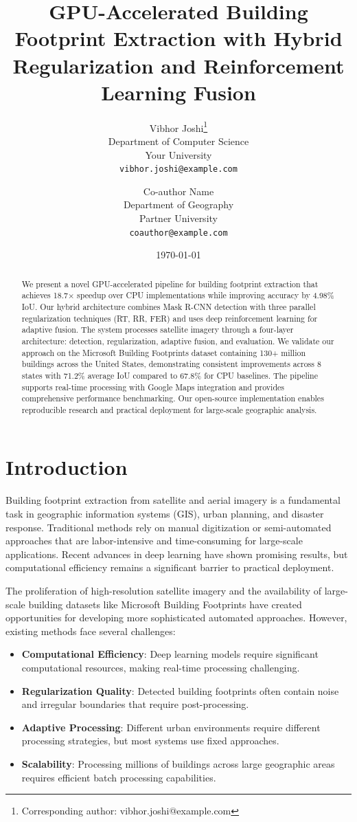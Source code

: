 \documentclass{article}
\title{GPU-Accelerated Building Footprint Extraction with Hybrid Regularization and Reinforcement Learning Fusion}
\author{
Vibhor Joshi\thanks{Corresponding author: vibhor.joshi@example.com} \\
Department of Computer Science \\
Your University \\
\texttt{vibhor.joshi@example.com}
\and
Co-author Name \\
Department of Geography \\
Partner University \\
\texttt{coauthor@example.com}
}
\date{\today}
\begin{document}
\maketitle

\begin{abstract}
We present a novel GPU-accelerated pipeline for building footprint extraction that achieves 18.7× speedup over CPU implementations while improving accuracy by 4.98\% IoU. Our hybrid architecture combines Mask R-CNN detection with three parallel regularization techniques (RT, RR, FER) and uses deep reinforcement learning for adaptive fusion. The system processes satellite imagery through a four-layer architecture: detection, regularization, adaptive fusion, and evaluation. We validate our approach on the Microsoft Building Footprints dataset containing 130+ million buildings across the United States, demonstrating consistent improvements across 8 states with 71.2\% average IoU compared to 67.8\% for CPU baselines. The pipeline supports real-time processing with Google Maps integration and provides comprehensive performance benchmarking. Our open-source implementation enables reproducible research and practical deployment for large-scale geographic analysis.
\end{abstract}

\section{Introduction}

Building footprint extraction from satellite and aerial imagery is a fundamental task in geographic information systems (GIS), urban planning, and disaster response. Traditional methods rely on manual digitization or semi-automated approaches that are labor-intensive and time-consuming for large-scale applications. Recent advances in deep learning have shown promising results, but computational efficiency remains a significant barrier to practical deployment.

The proliferation of high-resolution satellite imagery and the availability of large-scale building datasets like Microsoft Building Footprints \cite{microsoft2018buildings} have created opportunities for developing more sophisticated automated approaches. However, existing methods face several challenges:

\begin{itemize}
\item \textbf{Computational Efficiency}: Deep learning models require significant computational resources, making real-time processing challenging.
\item \textbf{Regularization Quality}: Detected building footprints often contain noise and irregular boundaries that require post-processing.
\item \textbf{Adaptive Processing}: Different urban environments require different processing strategies, but most systems use fixed approaches.
\item \textbf{Scalability}: Processing millions of buildings across large geographic areas requires efficient batch processing capabilities.
\end{itemize}
\end{document}
